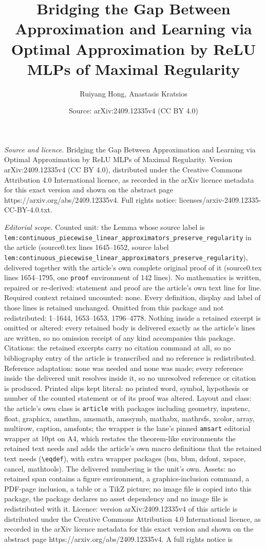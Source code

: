 \documentclass[10pt,a4paper]{amsart}
\title[Bridging the Gap Between Approximation and Learning via Opti]{Bridging the Gap Between Approximation and Learning via Optimal Approximation by ReLU MLPs of Maximal Regularity}
\author{Ruiyang Hong, Anastasis Kratsios}
\date{Source: arXiv:2409.12335v4 (CC BY 4.0)}
\begin{document}
\maketitle

\noindent\emph{Source and licence.} Bridging the Gap Between Approximation and Learning via Optimal Approximation by ReLU MLPs of Maximal Regularity. Version arXiv:2409.12335v4 (CC BY 4.0), distributed under the Creative Commons Attribution 4.0 International licence, as recorded in the arXiv licence metadata for this exact version and shown on the abstract page https://arxiv.org/abs/2409.12335v4. Full rights notice: licenses/arxiv-2409.12335-CC-BY-4.0.txt.\par\smallskip

\noindent\textit{Editorial scope.} Counted unit: the Lemma whose source label is \texttt{lem:continuous\_piecewise\_linear\_approximators\_preserve\_regularity} in the article (source0.tex lines 1645--1652, source label \texttt{lem:continuous\_piecewise\_linear\_approximators\_preserve\_regularity}), delivered together with the article's own complete original proof of it (source0.tex lines 1654--1795, one \texttt{proof} environment of 142 lines). No mathematics is written, repaired or re-derived: statement and proof are the article's own text line for line. Required context retained uncounted: none. Every definition, display and label of those lines is retained unchanged. Omitted from this package and not redistributed: 1--1644, 1653--1653, 1796--4778. Nothing inside a retained excerpt is omitted or altered: every retained body is delivered exactly as the article's lines are written, so no omission receipt of any kind accompanies this package. Citations: the retained excerpts carry no citation command at all, so no bibliography entry of the article is transcribed and no reference is redistributed. Reference adaptation: none was needed and none was made; every reference inside the delivered unit resolves inside it, so no unresolved reference or citation is produced. Printed slips kept literal: no printed word, symbol, hypothesis or number of the counted statement or of its proof was altered. Layout and class: the article's own class is \texttt{article} with packages including geometry, inputenc, float, graphicx, amsthm, amsmath, amssymb, mathabx, mathrsfs, xcolor, array, multirow, caption, amsfonts; the wrapper is the lane's pinned \texttt{amsart} editorial wrapper at 10pt on A4, which restates the theorem-like environments the retained text needs and adds the article's own macro definitions that the retained text needs (\texttt{\textbackslash eqdef}), with extra wrapper packages (bm, bbm, dsfont, xspace, cancel, mathtools). The delivered numbering is the unit's own. Assets: no retained span contains a figure environment, a graphics-inclusion command, a PDF-page inclusion, a table or a TikZ picture; no image file is copied into this package, the package declares no asset dependency and no image file is redistributed with it. Licence: version arXiv:2409.12335v4 of this article is distributed under the Creative Commons Attribution 4.0 International licence, as recorded in the arXiv licence metadata for this exact version and shown on the abstract page https://arxiv.org/abs/2409.12335v4. A full rights notice is 
\end{document}
